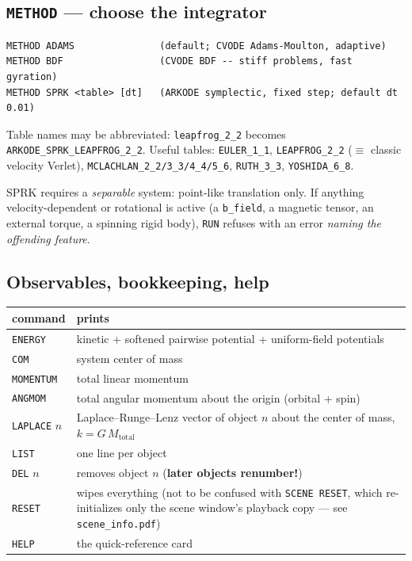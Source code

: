 \documentclass[11pt]{article}
\newcommand{\kw}[1]{\texttt{\uppercase{#1}}}
\newcommand{\code}[1]{\texttt{#1}}
\begin{document}
\subsection{\kw{method} --- choose the integrator}

\begin{lstlisting}
METHOD ADAMS               (default; CVODE Adams-Moulton, adaptive)
METHOD BDF                 (CVODE BDF -- stiff problems, fast gyration)
METHOD SPRK <table> [dt]   (ARKODE symplectic, fixed step; default dt 0.01)
\end{lstlisting}

Table names may be abbreviated: \code{leapfrog\_2\_2} becomes
\code{ARKODE\_SPRK\_LEAPFROG\_2\_2}. Useful tables: \code{EULER\_1\_1},
\code{LEAPFROG\_2\_2} ($\equiv$ classic velocity Verlet),
\code{MCLACHLAN\_2\_2/3\_3/4\_4/5\_6}, \code{RUTH\_3\_3},
\code{YOSHIDA\_6\_8}.

SPRK requires a \emph{separable} system: point-like translation only.
If anything velocity-dependent or rotational is active (a
\code{b\_field}, a magnetic tensor, an external torque, a spinning
rigid body), \kw{run} refuses with an error \emph{naming the offending
feature}.

\subsection{Observables, bookkeeping, help}

\begin{center}
\begin{tabular}{lp{10cm}}
\textbf{command} & \textbf{prints}\\\hline
\kw{energy} & kinetic + softened pairwise potential + uniform-field potentials\\
\kw{com} & system center of mass\\
\kw{momentum} & total linear momentum\\
\kw{angmom} & total angular momentum about the origin (orbital + spin)\\
\kw{laplace} $n$ & Laplace--Runge--Lenz vector of object $n$ about the center of mass, $k = G\,M_{\mathrm{total}}$\\
\kw{list} & one line per object\\
\kw{del} $n$ & removes object $n$ (\textbf{later objects renumber!})\\
\kw{reset} & wipes everything (not to be confused with \code{SCENE RESET}, which re-initializes only the scene window's playback copy --- see \code{scene\_info.pdf})\\
\kw{help} & the quick-reference card\\
\end{tabular}
\end{center}
\end{document}
